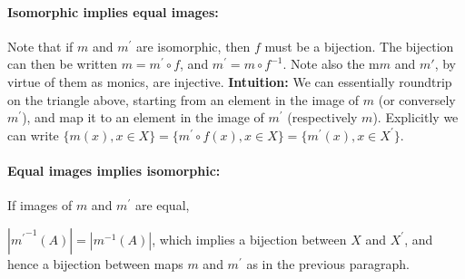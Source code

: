 \documentclass{article}
\begin{document}
\paragraph{Isomorphic implies equal images:}
Note that if $m$ and $m^\prime$ are isomorphic, then $f$ must be a bijection. The bijection can then be written $m = m^\prime \circ f$, and $m^\prime = m \circ f^{-1}$. Note also the m$m$ and $m\prime$, by virtue of them as monics, are injective. \textbf{Intuition:} We can essentially roundtrip on the triangle above, starting from an element in the image of $m$ (or conversely $m^\prime$), and map it to an element in the image of $m^\prime$ (respectively $m$).  Explicitly we can write $\{ m(x), x \in X \} = \{ m^\prime \circ f (x), x \in X \} = \{ m^\prime (x), x \in X^\prime \}$.

\paragraph{Equal images implies isomorphic:}

If images of $m$ and $m^\prime$ are equal,

$|{m^{\prime}}^{-1}(A)| = |m^{-1}(A)|$, which implies a bijection between $X$ and $X^\prime$, and hence a bijection between maps $m$ and $m^\prime$ as in the previous paragraph.
\end{document}
